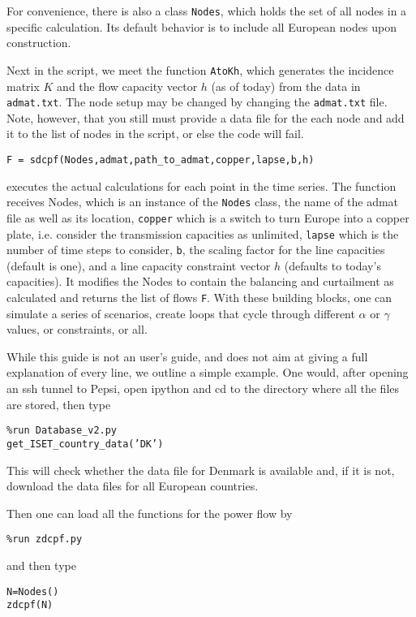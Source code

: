 \documentclass[english,twoside,a4paper,11pt]{article}
\numberwithin{equation}{section}
\begin{document}
For convenience, there is also a class \texttt{Nodes}, which holds the
set of all nodes in a specific calculation. Its default behavior is to
include all European nodes upon construction.

Next in the script, we meet the function \texttt{AtoKh}, which
generates the incidence matrix $K$ and the flow capacity vector $h$
(as of today) from the data in \texttt{admat.txt}. The node setup may
be changed by changing the \texttt{admat.txt} file. Note, however,
that you still must provide a data file for the each node and add it
to the list of nodes in the script, or else the code will fail.

\noindent
\texttt{F = sdcpf(Nodes,admat,path\_to\_admat,copper,lapse,b,h)}

executes the actual calculations for each point in the time
series. The function receives Nodes, which is an instance of the
\texttt{Nodes} class, the name of the admat file as well as its
location, \texttt{copper} which is a
switch to turn Europe into a copper plate, i.e. consider the
transmission capacities as unlimited, \texttt{lapse} which is the
number of time steps to consider, \texttt{b}, the scaling factor for
the line capacities (default is one), and a line capacity constraint
vector $h$ (defaults to today's capacities). It modifies the Nodes to
contain the balancing and curtailment as calculated and returns the
list of flows \texttt{F}.
With these building blocks, one can simulate a series of scenarios,
create loops that cycle through different $\alpha$ or $\gamma$ values,
or constraints, or all.

While this guide is not an user's guide, and does not aim at giving a
full explanation of every line, we outline a simple example. One would,
after opening an ssh tunnel to Pepsi, open ipython and cd to the
directory where all the files are stored, then type

\noindent \texttt{\%run Database\_v2.py \\
get\_ISET\_country\_data('DK')
}

This will check whether the data file for Denmark is available and, if
it is not, download the data files for all European countries.

Then one can load all the functions for the power flow by 

\noindent \texttt{\%run zdcpf.py
}

\noindent and then type

\noindent \texttt{N=Nodes()\\
zdcpf(N)
}
\end{document}
